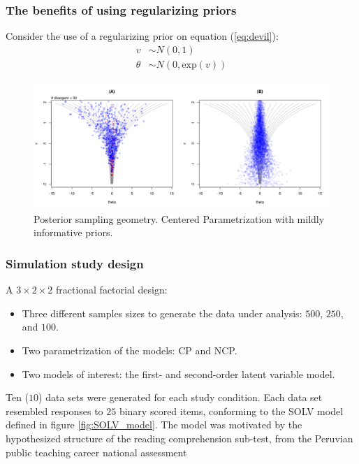 \documentclass[arial,12pt,xcolor=dvipsnames]{beamer}
\begin{document}
%
\begin{frame}
	\frametitle{The benefits of using regularizing priors}
	Consider the use of a regularizing prior on equation (\ref{eq:devil}): 
	\begin{equation} \label{eq:devil_prior}
		\begin{split}	
			v &\sim N(0, 1) \\
			\theta &\sim N(0, \text{exp}(v))
		\end{split}
	\end{equation}
	\begin{figure}[!h]
		\centering
		\includegraphics[width=0.8\linewidth]{2_funnel_CE_priors}
		\caption{Posterior sampling geometry. Centered Parametrization with mildly informative priors.}
		\label{fig:devil_prior_geom}
	\end{figure}
\end{frame}
%
\begin{frame}
	\frametitle{Simulation study design}
	A $3 \times 2 \times 2$ fractional factorial design:
	\begin{itemize}
		\item Three different samples sizes to generate the data under analysis: $500$, $250$, and $100$.
		\item Two parametrization of the models: CP and NCP.
		\item Two models of interest: the first- and second-order latent variable model.
	\end{itemize}
	Ten ($10$) data sets were generated for each study condition. Each data set resembled responses to $25$ binary scored items, conforming to the SOLV model defined in figure \ref{fig:SOLV_model}. The model was motivated by the hypothesized structure of the reading comprehension sub-test, from the Peruvian public teaching career national assessment
\end{frame}
%
\end{document}
